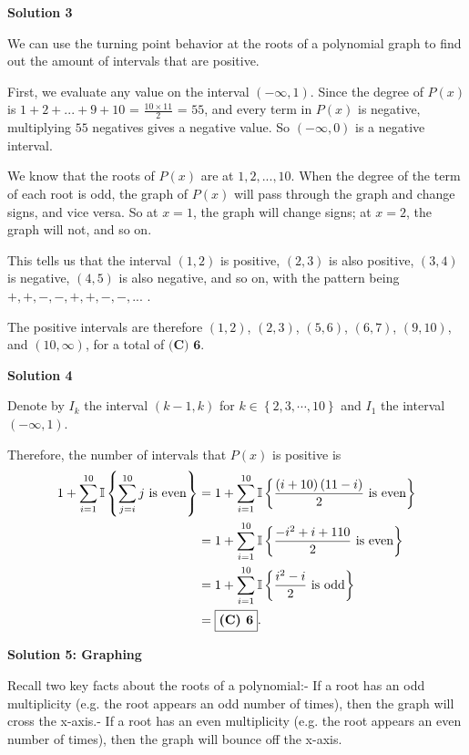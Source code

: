 \begin{enumerate}
 



\textbf{Solution 3}

We can use the turning point behavior at the roots of a polynomial graph to find out the amount of intervals that are positive.

 First, we evaluate any value on the interval $(-\infty, 1)$. Since the degree of $P(x)$ is $1+2+...+9+10$ = $\frac{10\times11}{2}$ = $55$, and every term in $P(x)$ is negative, multiplying $55$ negatives gives a negative value. So $(-\infty, 0)$ is a negative interval.

 We know that the roots of $P(x)$ are at $1,2,...,10$. When the degree of the term of each root is odd, the graph of $P(x)$ will pass through the graph and change signs, and vice versa. So at $x=1$, the graph will change signs; at $x=2$, the graph will not, and so on.

 This tells us that the interval $(1,2)$ is positive, $(2,3)$ is also positive, $(3,4)$ is negative, $(4,5)$ is also negative, and so on, with the pattern being $+,+,-,-,+,+,-,-,...$ .

 The positive intervals are therefore $(1,2)$, $(2,3)$, $(5,6)$, $(6,7)$, $(9,10)$, and $(10,\infty)$, for a total of $\boxed{\textbf{(C) 6}}$.

 



\textbf{Solution 4}

Denote by $I_k$ the interval $\left( k - 1 , k \right)$ for $k \in \left\{ 2, 3, \cdots , 10 \right\}$ and $I_1$ the interval $\left( - \infty, 1 \right)$.

 Therefore, the number of intervals that $P(x)$ is positive is
 \begin{align*} 1 + \sum_{i=1}^{10} \Bbb I \left\{  \sum_{j=i}^{10} j \mbox{ is even}   \right\}   & = 1 + \sum_{i=1}^{10} \Bbb I \left\{ \frac{\left( i + 10 \right) \left( 11 - i \right)}{2} \mbox{ is even}   \right\} \\  & = 1 + \sum_{i=1}^{10} \Bbb I \left\{ \frac{- i^2 + i + 110}{2} \mbox{ is even}   \right\} \\  & = 1 + \sum_{i=1}^{10} \Bbb I \left\{ \frac{i^2 - i}{2} \mbox{ is odd}   \right\} \\  & = \boxed{\textbf{(C) 6}} . \end{align*}





\textbf{Solution 5: Graphing}

Recall two key facts about the roots of a polynomial:- If a root has an odd multiplicity (e.g. the root appears an odd number of times), then the graph will cross the x-axis.- If a root has an even multiplicity (e.g. the root appears an even number of times), then the graph will bounce off the x-axis.


\end{enumerate}
